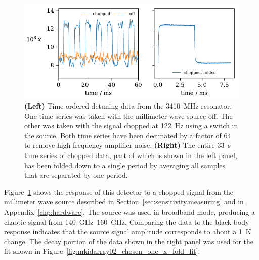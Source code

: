 \begin{figure}[htb]
\centering
\includegraphics[width=\textwidth]{multichroic/mkidarray02_chosen_one_mmw_decimated_and_folded.pdf}
\caption[MKIDArray02-0001: decimated and folded time-ordered data for the \SI{3410}{MHz} resonator.]
{
\textbf{(Left)}
Time-ordered detuning data from the \SI{3410}{MHz} resonator.
One time series was taken with the millimeter-wave source off.
The other was taken with the signal chopped at \SI{122}{Hz} using a switch in the source.
Both time series have been decimated by a factor of 64 to remove high-frequency amplifier noise.
\textbf{(Right)}
The entire \SI{33}{s} time series of chopped data, part of which is shown in the left panel, has been folded down to a single period by averaging all samples that are separated by one period.
}
\label{fig:mkidarray02_chosen_one_mmw_decimated_and_folded}
\end{figure}

Figure~\ref{fig:mkidarray02_chosen_one_mmw_decimated_and_folded} shows the response of this detector to a chopped signal from the millimeter wave source described in Section~\ref{sec:sensitivity.measuring} and in Appendix~\ref{chp:hardware}.
The source was used in broadband mode, producing a chaotic  signal from \SIrange{140}{160}{GHz}.
Comparing the data to the black body response indicates that the source signal amplitude corresponds to about a \SI{1}{K} change.
The decay portion of the data shown in the right panel was used for the fit shown in Figure~\ref{fig:mkidarray02_chosen_one_x_fold_fit}.

